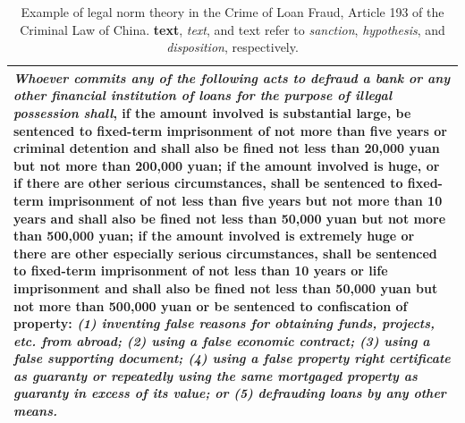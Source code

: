 
\begin{table}[t]
    \centering
    \small
    \begin{tabular}{p{}}
        \toprule
        {{\textit{Whoever commits any of the following acts to defraud a bank or any other financial institution of loans for the purpose of illegal possession shall}, {if the amount involved is substantial large}, \textbf{be sentenced to fixed-term imprisonment of not more than five years or criminal detention and shall also be fined not less than 20,000 yuan but not more than 200,000 yuan}; {if the amount involved is huge, or if there are other serious circumstances}, \textbf{shall be sentenced to fixed-term imprisonment of not less than five years but not more than 10 years and shall also be fined not less than 50,000 yuan but not more than 500,000 yuan}; {if the amount involved is extremely huge or there are other especially serious circumstances}, \textbf{shall be sentenced to fixed-term imprisonment of not less than 10 years or life imprisonment and shall also be fined not less than 50,000 yuan but not more than 500,000 yuan or be sentenced to confiscation of property}: \textit{(1) inventing false reasons for obtaining funds, projects, etc. from abroad; (2) using a false economic contract; (3) using a false supporting document; (4) using a false property right certificate as guaranty or repeatedly using the same mortgaged property as guaranty in excess of its value; or (5) defrauding loans by any other means.}}}\\
        \bottomrule
    \end{tabular}
    \caption{Example of legal norm theory in the Crime of Loan Fraud, Article 193 of the Criminal Law of China. \textbf{text}, \textit{text}, and {text}  refer to \textit{sanction}, \textit{hypothesis}, and \textit{disposition}, respectively.}
    \label{tab:three}
    \vspace{-2em}
\end{table}

